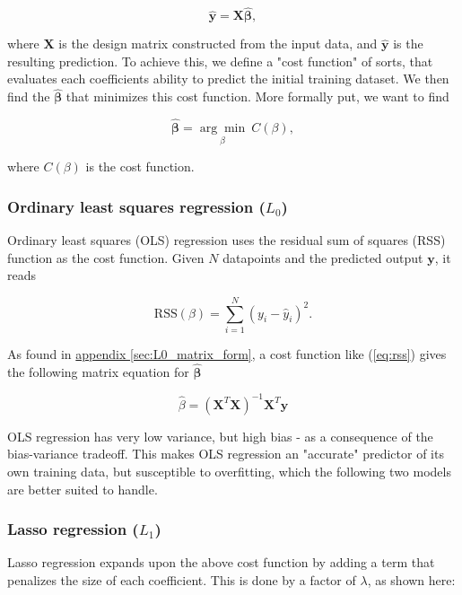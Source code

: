\documentclass[../main.tex]{subfiles}
\begin{document}
\begin{equation*}
  \hat{\mathbf y} = \mathbf X\hat{\mathbf \beta},
\end{equation*}

where $\mathbf X$ is the design matrix constructed from the input data, and $\hat{\mathbf y}$ is the resulting prediction. To achieve this, we define a "cost function" of sorts, that evaluates each coefficients ability to predict the initial training dataset. We then find the $\hat{\mathbf \beta}$ that minimizes this cost function. More formally put, we want to find

\begin{equation}
  \hat{\mathbf \beta} = \underset{\beta}{\arg \min}\ C(\beta),
\end{equation}

where $C(\beta)$ is the cost function.


\subsubsection{Ordinary least squares regression ($L_0$)}
Ordinary least squares (OLS) regression uses the residual sum of squares (RSS) function as the cost function. Given $N$ datapoints and the predicted output $\mathbf y$, it reads

\begin{equation}
  \label{eq:rss}
  \text{RSS}(\beta) = \sum_{i=1}^N (y_i - \hat y_i)^2.
\end{equation}

As found in \hyperref[sec:L0_matrix_form]{appendix \ref*{sec:L0_matrix_form}}, a cost function like (\ref{eq:rss}) gives the following matrix equation for $\hat{\mathbf \beta}$

\begin{equation}
  \label{eq:L0_matrix_form}
  \hat \beta = (\mathbf X^T\mathbf X)^{-1}\mathbf X^T \mathbf y
\end{equation}

OLS regression has very low variance, but high bias - as a consequence of the bias-variance tradeoff. This makes OLS regression an "accurate" predictor of its own training data, but susceptible to overfitting, which the following two models are better suited to handle.


\subsubsection{Lasso regression ($L_1$)}
Lasso regression expands upon the above cost function by adding a term that penalizes the size of each coefficient. This is done by a factor of $\lambda$, as shown here:
\end{document}
